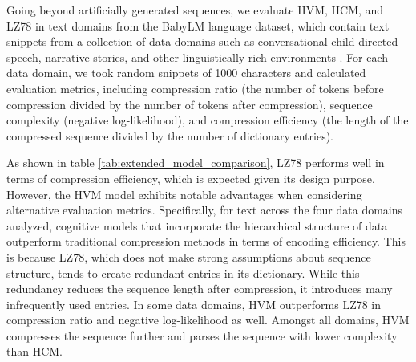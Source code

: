 \documentclass{article} %
\theoremstyle{remark}
\begin{document}
Going beyond artificially generated sequences, we evaluate HVM, HCM, and LZ78 in text domains from the BabyLM language dataset, which contain text snippets from a collection of data domains such as conversational child-directed speech, narrative stories, and other linguistically rich environments \cite{warstadt2023papersbabylmchallenge}. For each data domain, we took random snippets of 1000 characters and calculated evaluation metrics, including compression ratio (the number of tokens before compression divided by the number of tokens after compression), sequence complexity (negative log-likelihood), and compression efficiency (the length of the compressed sequence divided by the number of dictionary entries). 

As shown in table \ref{tab:extended_model_comparison}, LZ78 performs well in terms of compression efficiency, which is expected given its design purpose. However, the HVM model exhibits notable advantages when considering alternative evaluation metrics. Specifically, for text across the four data domains analyzed, cognitive models that incorporate the hierarchical structure of data outperform traditional compression methods in terms of encoding efficiency. This is because LZ78, which does not make strong assumptions about sequence structure, tends to create redundant entries in its dictionary. While this redundancy reduces the sequence length after compression, it introduces many infrequently used entries. In some data domains, HVM outperforms LZ78 in compression ratio and negative log-likelihood as well. Amongst all domains, HVM compresses the sequence further and parses the sequence with lower complexity than HCM.

\end{document}
